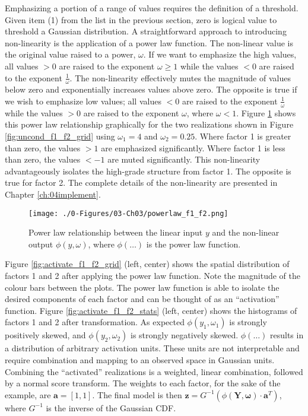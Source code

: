 Emphasizing a portion of a range of values requires the definition of a threshold. Given item (1) from the list in the previous section, zero is logical value to threshold a Gaussian distribution. A straightforward approach to introducing non-linearity is the application of a power law function. The non-linear value is the original value raised to a power, $\omega$. If we want to emphasize the high values, all values $> 0$ are raised to the exponent $\omega \geq 1$ while the values $< 0$ are raised to the exponent $\frac{1}{\omega}$. The non-linearity effectively mutes the magnitude of values below zero and exponentially increases values above zero. The opposite is true if we wish to emphasize low values; all values $< 0$ are raised to the exponent $\frac{1}{\omega}$ while the values $> 0$ are raised to the exponent $\omega$, where $\omega < 1$. Figure \ref{fig:powerlaw_f1_f2} shows this power law relationship graphically for the two realizations shown in Figure \ref{fig:uncond_f1_f2_grid} using $\omega_{1}=4$ and $\omega_{2}=0.25$. Where factor 1 is greater than zero, the values $> 1$ are emphasized significantly. Where factor 1 is less than zero, the values $< -1$ are muted significantly. This non-linearity advantageously isolates the high-grade structure from factor 1. The opposite is true for factor 2. The complete details of the non-linearity are presented in Chapter \ref{ch:04implement}.

\begin{figure}[htb!]
    \centering
    \texttt{[image: ./0-Figures/03-Ch03/powerlaw\_f1\_f2.png]}
    \caption{Power law relationship between the linear input $y$ and the non-linear output $\phi(y, \omega)$, where $\phi(\dots)$ is the power law function. }
    \label{fig:powerlaw_f1_f2}
\end{figure}

Figure \ref{fig:activate_f1_f2_grid} (left, center) shows the spatial distribution of factors 1 and 2 after applying the power law function. Note the magnitude of the colour bars between the plots. The power law function is able to isolate the desired components of each factor and can be thought of as an ``activation'' function. Figure \ref{fig:activate_f1_f2_stats} (left, center) shows the histograms of factors 1 and 2 after transformation. As expected $\phi(y_{1}, \omega_{1})$ is strongly positively skewed, and $\phi(y_{2}, \omega_{2})$ is strongly negatively skewed. $\phi(\dots)$ results in a distribution of arbitrary activation units. These units are not interpretable and require combination and mapping to an observed space in Gaussian units. Combining the ``activated'' realizations is a weighted, linear combination, followed by a normal score transform. The weights to each factor, for the sake of the example, are $\mathbf{a} = [1,1]$. The final model is then $\mathbf{z} = G^{-1}(\phi(\mathbf{Y}, \boldsymbol{\omega}) \cdot \mathbf{a}^{T})$, where $G^{-1}$ is the inverse of the Gaussian \gls{CDF}.

